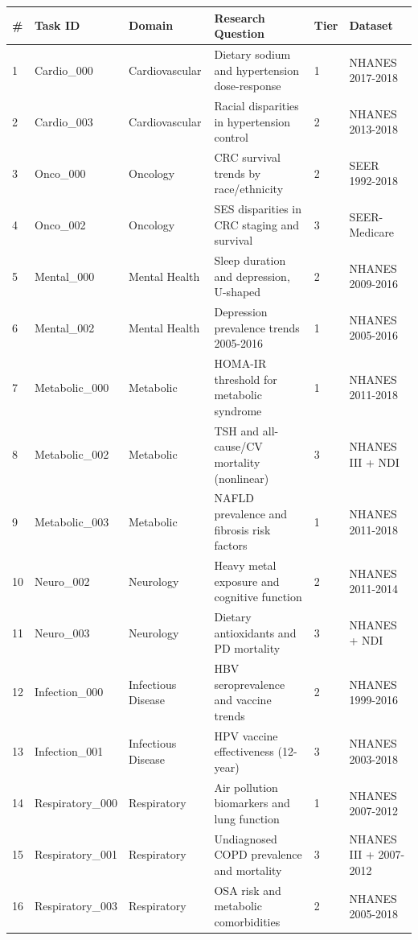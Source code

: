 \documentclass[12pt]{article}
\begin{document}
\footnotesize
\begin{longtable}{@{}p{0.4cm}p{2.1cm}p{1.9cm}p{5.0cm}p{0.6cm}p{2.2cm}@{}}
\toprule
\textbf{\#} & \textbf{Task ID} & \textbf{Domain} & \textbf{Research Question} & \textbf{Tier} & \textbf{Dataset} \\
\midrule
\endhead
1 & Cardio\_000 & Cardiovascular & Dietary sodium and hypertension dose-response & 1 & NHANES 2017-2018 \\
2 & Cardio\_003 & Cardiovascular & Racial disparities in hypertension control & 2 & NHANES 2013-2018 \\
3 & Onco\_000 & Oncology & CRC survival trends by race/ethnicity & 2 & SEER 1992-2018 \\
4 & Onco\_002 & Oncology & SES disparities in CRC staging and survival & 3 & SEER-Medicare \\
5 & Mental\_000 & Mental Health & Sleep duration and depression, U-shaped & 2 & NHANES 2009-2016 \\
6 & Mental\_002 & Mental Health & Depression prevalence trends 2005-2016 & 1 & NHANES 2005-2016 \\
7 & Metabolic\_000 & Metabolic & HOMA-IR threshold for metabolic syndrome & 1 & NHANES 2011-2018 \\
8 & Metabolic\_002 & Metabolic & TSH and all-cause/CV mortality (nonlinear) & 3 & NHANES III + NDI \\
9 & Metabolic\_003 & Metabolic & NAFLD prevalence and fibrosis risk factors & 1 & NHANES 2011-2018 \\
10 & Neuro\_002 & Neurology & Heavy metal exposure and cognitive function & 2 & NHANES 2011-2014 \\
11 & Neuro\_003 & Neurology & Dietary antioxidants and PD mortality & 3 & NHANES + NDI \\
12 & Infection\_000 & Infectious Disease & HBV seroprevalence and vaccine trends & 2 & NHANES 1999-2016 \\
13 & Infection\_001 & Infectious Disease & HPV vaccine effectiveness (12-year) & 3 & NHANES 2003-2018 \\
14 & Respiratory\_000 & Respiratory & Air pollution biomarkers and lung function & 1 & NHANES 2007-2012 \\
15 & Respiratory\_001 & Respiratory & Undiagnosed COPD prevalence and mortality & 3 & NHANES III + 2007-2012 \\
16 & Respiratory\_003 & Respiratory & OSA risk and metabolic comorbidities & 2 & NHANES 2005-2018 \\
\bottomrule
\end{longtable}
\end{document}
